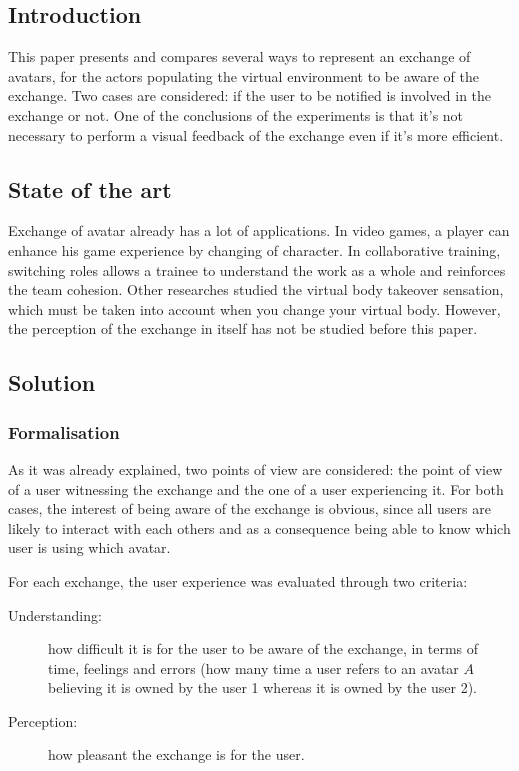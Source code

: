 \documentclass[a4paper]{article}
\begin{document}
\subsection{Introduction}

This paper presents and compares several ways to represent an exchange of avatars, for the actors populating the virtual environment to be aware of the exchange. Two cases are considered: if the user to be notified is involved in the exchange or not. One of the conclusions of the experiments is that it's not necessary to perform a visual feedback of the exchange even if it's more efficient.

\subsection{State of the art}

Exchange of avatar already has a lot of applications. In video games, a player can enhance his game experience by changing of character. In collaborative training, switching roles allows a trainee to understand the work as a whole and reinforces the team cohesion. Other researches studied the virtual body takeover sensation, which must be taken into account when you change your virtual body. However, the perception of the exchange in itself has not be studied before this paper.

\subsection{Solution}

\subsubsection{Formalisation}
As it was already explained, two points of view are considered: the point of view of a user witnessing the exchange and the one of a user experiencing it. For both cases, the interest of being aware of the exchange is obvious, since all users are likely to interact with each others and as a consequence being able to know which user is using which avatar.

For each exchange, the user experience was evaluated through two criteria:
\begin{description}
	\item[Understanding:] how difficult it is for the user to be aware of the exchange, in terms of time, feelings and errors (how many time a user refers to an avatar $A$ believing it is owned by the user 1 whereas it is owned by the user 2).
	\item[Perception:] how pleasant the exchange is for the user.
\end{description}
\end{document}

